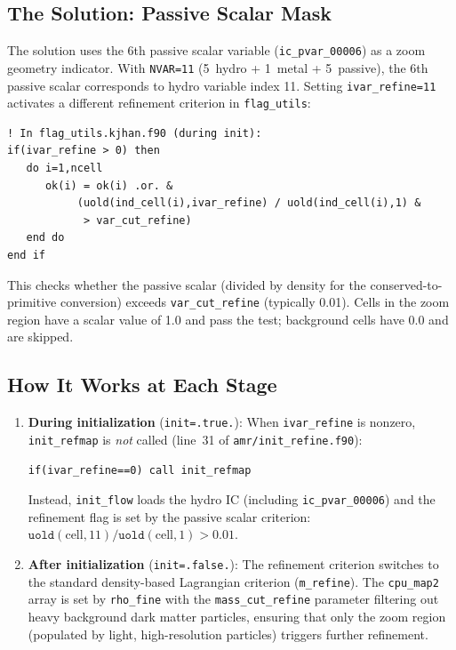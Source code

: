 \documentclass[11pt,fleqn]{book}
\begin{document}
\subsection{The Solution: Passive Scalar Mask}

The solution uses the 6th passive scalar variable (\texttt{ic\_pvar\_00006}) as a zoom geometry indicator. With \texttt{NVAR=11} (5~hydro + 1~metal + 5~passive), the 6th passive scalar corresponds to hydro variable index 11. Setting \texttt{ivar\_refine=11} activates a different refinement criterion in \texttt{flag\_utils}:

\begin{lstlisting}[style=fortran,numbers=none]
! In flag_utils.kjhan.f90 (during init):
if(ivar_refine > 0) then
   do i=1,ncell
      ok(i) = ok(i) .or. &
           (uold(ind_cell(i),ivar_refine) / uold(ind_cell(i),1) &
            > var_cut_refine)
   end do
end if
\end{lstlisting}

This checks whether the passive scalar (divided by density for the conserved-to-primitive conversion) exceeds \texttt{var\_cut\_refine} (typically 0.01). Cells in the zoom region have a scalar value of 1.0 and pass the test; background cells have 0.0 and are skipped.

\subsection{How It Works at Each Stage}

\begin{enumerate}
  \item \textbf{During initialization} (\texttt{init=.true.}): When \texttt{ivar\_refine} is nonzero, \texttt{init\_refmap} is \emph{not} called (line~31 of \texttt{amr/init\_refine.f90}):
\begin{lstlisting}[style=fortran,numbers=none]
if(ivar_refine==0) call init_refmap
\end{lstlisting}
  Instead, \texttt{init\_flow} loads the hydro IC (including \texttt{ic\_pvar\_00006}) and the refinement flag is set by the passive scalar criterion: $\texttt{uold}(\text{cell},11)/\texttt{uold}(\text{cell},1) > 0.01$.

  \item \textbf{After initialization} (\texttt{init=.false.}): The refinement criterion switches to the standard density-based Lagrangian criterion (\texttt{m\_refine}). The \texttt{cpu\_map2} array is set by \texttt{rho\_fine} with the \texttt{mass\_cut\_refine} parameter filtering out heavy background dark matter particles, ensuring that only the zoom region (populated by light, high-resolution particles) triggers further refinement.
\end{enumerate}
\end{document}
